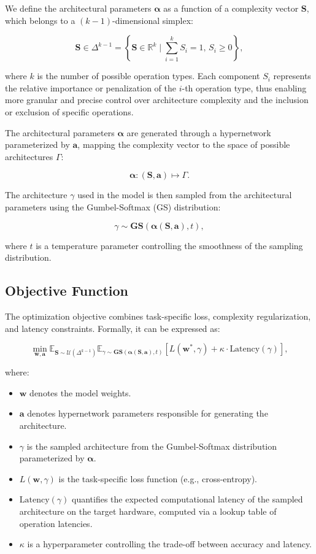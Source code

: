\documentclass{article}
\begin{document}
We define the architectural parameters $\boldsymbol{\alpha}$ as a function of a complexity vector $\boldsymbol{S}$, which belongs to a $(k-1)$-dimensional simplex:

$$
\boldsymbol{S} \in \Delta^{k-1} = \left\{ \boldsymbol{S} \in \mathbb{R}^{k} \mid \sum_{i=1}^{k} S_i = 1,\, S_i \geq 0 \right\},
$$

where $k$ is the number of possible operation types. Each component $S_i$ represents the relative importance or penalization of the $i$-th operation type, thus enabling more granular and precise control over architecture complexity and the inclusion or exclusion of specific operations.

The architectural parameters $\boldsymbol{\alpha}$ are generated through a hypernetwork parameterized by $\boldsymbol{a}$, mapping the complexity vector to the space of possible architectures $\Gamma$:

$$
\boldsymbol{\alpha}: (\boldsymbol{S}, \boldsymbol{a}) \mapsto \Gamma.
$$

The architecture $\gamma$ used in the model is then sampled from the architectural parameters using the Gumbel-Softmax (GS) distribution:

$$
\gamma \sim \textbf{GS}(\boldsymbol{\alpha}(\boldsymbol{S}, \boldsymbol{a}), t),
$$

where $t$ is a temperature parameter controlling the smoothness of the sampling distribution.


\subsection{Objective Function}

The optimization objective combines task-specific loss, complexity regularization, and latency constraints. Formally, it can be expressed as:

$$
\min_{\boldsymbol{w}, \boldsymbol{a}} \mathbb{E}_{\boldsymbol{S} \sim \mathcal{U}(\Delta^{k-1})} \mathbb{E}_{\gamma \sim \textbf{GS}(\boldsymbol{\alpha}(\boldsymbol{S}, \boldsymbol{a}), t)} \left[ L(\boldsymbol{w}^*, \gamma) + \kappa \cdot \text{Latency}(\gamma) \right],
$$


where:
\begin{itemize}
    \item  $\boldsymbol{w}$ denotes the model weights.
    \item  $\boldsymbol{a}$ denotes hypernetwork parameters responsible for generating the architecture.
    \item  $\gamma$ is the sampled architecture from the Gumbel-Softmax distribution parameterized by $\boldsymbol{\alpha}$.
    \item  $L(\boldsymbol{w}, \gamma)$ is the task-specific loss function (e.g., cross-entropy).
    \item  $\text{Latency}(\gamma)$ quantifies the expected computational latency of the sampled architecture on the target hardware, computed via a lookup table of operation latencies.
    \item  $\kappa$ is a hyperparameter controlling the trade-off between accuracy and latency.
\end{itemize}
\end{document}
